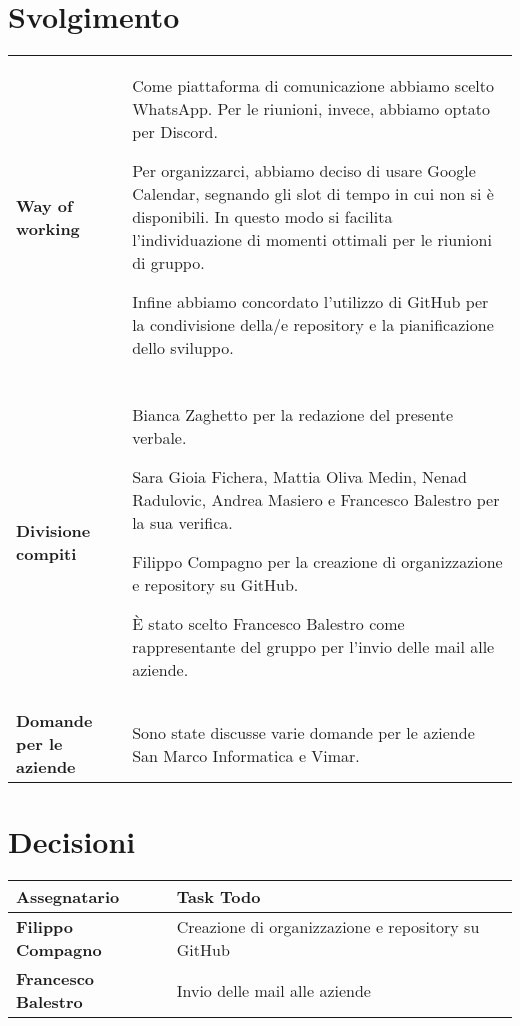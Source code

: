 \documentclass[a4paper,12pt]{article}
\begin{document}
\section{Svolgimento}
\begin{longtable}{P{5cm}|P{10cm}} 
\textbf{Way of working} & Come piattaforma di comunicazione abbiamo scelto WhatsApp. Per le riunioni, invece, abbiamo optato per Discord.

Per organizzarci, abbiamo deciso di usare Google Calendar, segnando gli slot di tempo in cui non si è disponibili. In questo modo si facilita l'individuazione di momenti ottimali per le riunioni di gruppo.

Infine abbiamo concordato l'utilizzo di GitHub per la condivisione della/e repository e la pianificazione dello sviluppo.\\
\\
\textbf{Divisione compiti} & Bianca Zaghetto per la redazione del presente verbale.

Sara Gioia Fichera, Mattia Oliva Medin, Nenad Radulovic, Andrea Masiero e Francesco Balestro per la sua verifica.

Filippo Compagno per la creazione di organizzazione e repository su GitHub.

È stato scelto Francesco Balestro come rappresentante del gruppo per l'invio delle mail alle aziende. \\
\\
\textbf{Domande per le aziende} & Sono state discusse varie domande per le aziende San Marco Informatica e Vimar.  \\
\end{longtable}

\section{Decisioni}

\begin{tabularx}{\textwidth}{|l|X|}
\hline
\textbf{Assegnatario} & \textbf{Task Todo} \\
\hline
\textbf{Filippo Compagno} & Creazione di
organizzazione e repository su GitHub \\
\hline
\textbf{Francesco Balestro} & Invio delle mail
alle aziende \\
\hline

\end{tabularx}
\end{document}
